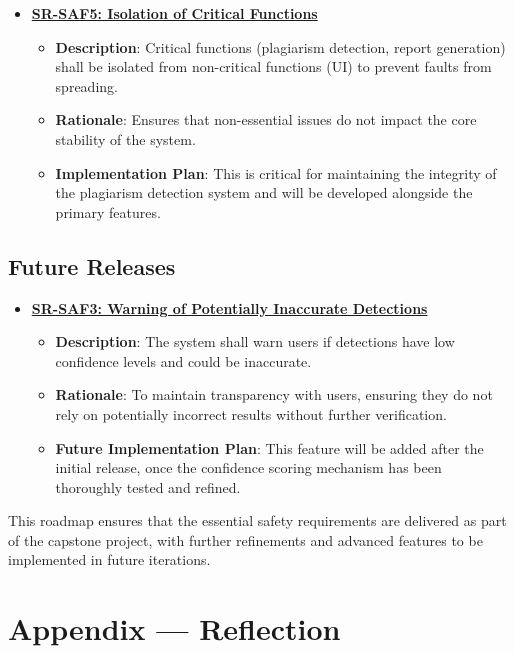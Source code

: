 \documentclass{article}
\begin{document}
\begin{itemize}
    \item \textbf{\hyperref[req:saf5]{SR-SAF5: Isolation of Critical Functions}}
    \begin{itemize}
        \item \textbf{Description}: Critical functions (plagiarism detection, report generation) shall be isolated from non-critical functions (UI) to prevent faults from spreading.
        \item \textbf{Rationale}: Ensures that non-essential issues do not impact the core stability of the system.
        \item \textbf{Implementation Plan}: This is critical for maintaining the integrity of the plagiarism detection system and will be developed alongside the primary features.
    \end{itemize}
\end{itemize}

\subsection{Future Releases}

\begin{itemize}
    \item \textbf{\hyperref[req:saf3]{SR-SAF3: Warning of Potentially Inaccurate Detections}}
    \begin{itemize}
        \item \textbf{Description}: The system shall warn users if detections have low confidence levels and could be inaccurate.
        \item \textbf{Rationale}: To maintain transparency with users, ensuring they do not rely on potentially incorrect results without further verification.
        \item \textbf{Future Implementation Plan}: This feature will be added after the initial release, once the confidence scoring mechanism has been thoroughly tested and refined.
    \end{itemize}
\end{itemize}

This roadmap ensures that the essential safety requirements are delivered as part of the capstone project, with further refinements and advanced features to be implemented in future iterations.

\newpage{}

\section*{Appendix --- Reflection}
\end{document}

